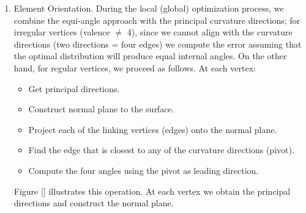 \documentclass[titlepage]{article}
\begin{document}
 \begin{enumerate}
  \item Element Orientation. During the local (global) optimization process, we combine the equi-angle approach with 
  the principal curvature directions; for irregular vertices (valence $\neq$ 4), since we cannot align with the curvature directions (two directions = four edges) we compute the error assuming that the 
  optimal distribution will produce equal internal angles. On the other hand, for regular vertices, we proceed as follows. At each vertex:
  \begin{itemize}
   \item Get principal directions.
   \item Construct normal plane to the surface. 
   \item Project each of the linking vertices (edges) onto the normal plane. 
   \item Find the edge that is closest to any of the curvature directions (pivot). 
   \item Compute the four angles using the pivot as leading direction. 
  \end{itemize}
  Figure \ref{} illustrates this operation. 
At each vertex we obtain the principal directions and construct the normal plane. 
 

 
 

\end{enumerate}
\end{document}
